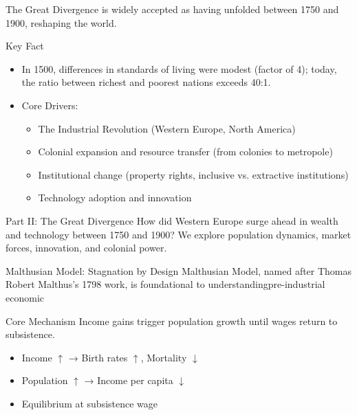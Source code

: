 \documentclass[aspectratio=169]{beamer}
\begin{document}
\begin{frame}
	The Great Divergence is widely accepted as having unfolded between 1750 and
1900, reshaping the world.

	\begin{block}{Key Fact}
		\begin{itemize}[<+->]
			\item In 1500, differences in standards of living were modest (factor of 4); today, the ratio
					between richest and poorest nations exceeds 40:1.
			\item Core Drivers:
				\begin{itemize}
					\item The Industrial Revolution (Western Europe, North America)
					\item Colonial expansion and resource transfer (from colonies to metropole)
					\item Institutional change (property rights, inclusive vs. extractive institutions)
					\item Technology adoption and innovation
				\end{itemize}
		\end{itemize}
	\end{block}

\end{frame}

\begin{frame}{Part II: The Great Divergence}
  How did Western Europe surge ahead in wealth and technology between 1750 and 1900?
  We explore population dynamics, market forces, innovation, and colonial power.
\end{frame}

\begin{frame}{Malthusian Model: Stagnation by Design}
	Malthusian Model, named after Thomas Robert Malthus's 1798 work, is
foundational to understandingpre-industrial economic
  \begin{block}{Core Mechanism}
    Income gains trigger population growth until wages return to subsistence.
  \end{block}
  \vspace{0.5em}
  \begin{itemize}[<+->]
    \item Income \(\uparrow\) → Birth rates \(\uparrow\), Mortality \(\downarrow\)  
    \item Population \(\uparrow\) → Income per capita \(\downarrow\)  
    \item Equilibrium at subsistence wage  
  \end{itemize}
\end{frame}
\end{document}
